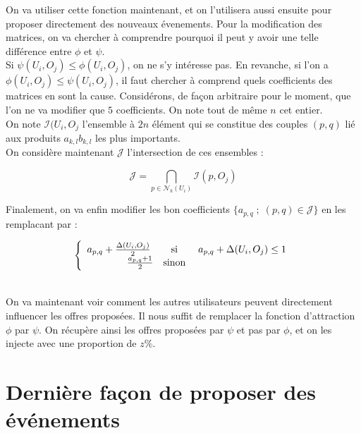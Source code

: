 \documentclass[11pt, oneside]{article}
\begin{document}
On va utiliser cette fonction maintenant, et on l'utilisera aussi ensuite pour proposer directement des nouveaux évenements. Pour la modification des matrices, on va chercher à comprendre pourquoi il peut y avoir une telle différence entre $\phi$ et $\psi$. \\
 Si $\psi(U_i,O_j) \leq \phi(U_i,O_j)$, on ne s'y intéresse pas. En revanche, si l'on a $\phi(U_i,O_j) \leq \psi(U_i,O_j)$, il faut chercher à comprend quels coefficients des matrices en sont la cause. Considérons, de façon arbitraire pour le moment, que l'on ne va modifier que $5$ coefficients. On note tout de même $n$ cet entier. \\
On note $\mathcal{I} (U_i,O_j$ l'ensemble à $2n$ élément qui se constitue des couples $(p,q)$ lié aux produits $a_{k,l}b_{k,l} $ les plus importants. \\
On considère maintenant $\mathcal{J}$ l'intersection de ces ensembles :
\begin{center}
\[
\mathcal{J} = \bigcap _{p \in \mathcal{N} _k (U_i) } \mathcal{I} (p,O_j)
\]

\end{center}

Finalement, on va enfin modifier les bon coefficients $\{a_{p,q} \; ; \; (p,q) \in \mathcal{J} \} $ en les remplacant par :
\begin{center}
\[
 \left \{
   \begin{array}{r c l}
       a_{p,q} + \frac{\Delta (U_i,O_j)}{2} \;  &\text{si}& \; a_{p,q} + \Delta (U_i,O_j) \leq 1  \\
       \frac{ a_{p,q} + 1}{2} &\text{sinon}& \\
   \end{array}
   \right .
\]
\end{center}
\\

On va maintenant voir comment les autres utilisateurs peuvent directement influencer les offres proposées. Il nous suffit de remplacer la fonction d'attraction $\phi$ par $\psi$. On récupère ainsi les offres proposées par $\psi$ et pas par $\phi$, et on les injecte avec une proportion de $z \%$.

\section{Dernière façon de proposer des événements}
\end{document}
